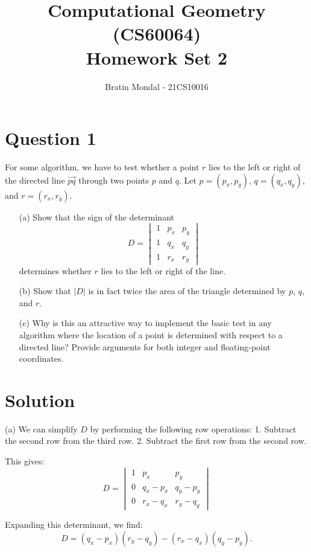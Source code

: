 \documentclass[12pt]{article}
\title{Computational Geometry (CS60064)\\ Homework Set 2}
\author{
    Bratin Mondal - 21CS10016
}
\date{}
\begin{document}
\maketitle

\section*{Question 1}
For some algorithm, we have to test whether a point \( r \) lies to the left or right of the directed line \( \vec{pq} \) through two points \( p \) and \( q \). Let \( p = (p_x, p_y) \), \( q = (q_x, q_y) \), and \( r = (r_x, r_y) \).

\begin{enumerate}
    \item[(a)] Show that the sign of the determinant
    \[
    D = \begin{vmatrix}
    1 & p_x & p_y \\
    1 & q_x & q_y \\
    1 & r_x & r_y
    \end{vmatrix}
    \]
    determines whether \( r \) lies to the left or right of the line.

    \item[(b)] Show that \( |D| \) is in fact twice the area of the triangle determined by \( p \), \( q \), and \( r \).

    \item[(c)] Why is this an attractive way to implement the basic test in any algorithm where the location of a point is determined with respect to a directed line? Provide arguments for both integer and floating-point coordinates.
\end{enumerate}

\section*{Solution}

(a) We can simplify \( D \) by performing the following row operations: 
1. Subtract the second row from the third row.
2. Subtract the first row from the second row.

This gives:
\[
D =
\begin{vmatrix}
1 & p_x & p_y \\
0 & q_x - p_x & q_y - p_y \\
0 & r_x - q_x & r_y - q_y
\end{vmatrix}
\]

Expanding this determinant, we find:
\[
D = (q_x - p_x)(r_y - q_y) - (r_x - q_x)(q_y - p_y).
\]
\end{document}
